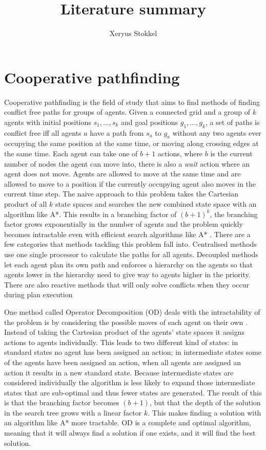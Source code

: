 \documentclass[a4paper]{article}
\title{Literature summary}
\author{Xeryus Stokkel}
\begin{document}
\maketitle

\section{Cooperative pathfinding}
Cooperative pathfinding is the field of study that aims to find methods of
finding conflict free paths for groups of agents. Given a connected grid and a
group of $k$ agents with initial positions $s_1, \ldots, s_k$ and goal
positions $g_1, \ldots, g_k$, a set of paths is conflict free iff all agents
$a$ have a path from $s_a$ to $g_a$ without any two agents ever occupying
the same position at the same time, or moving along crossing edges at the same
time. Each agent can take one of $b+1$ actions, where $b$ is the current number
of nodes the agent can move into, there is also a \textit{wait} action where an
agent does not move. Agents are allowed to move at the same time and are
allowed to move to a position if the currently occupying agent also moves in
the current time step. The naive approach to this problem takes the Cartesian
product of all $k$ state spaces and searches the new combined state space with 
an algorithm like A*.
This results in a branching factor of $(b+1)^k$, the branching factor grows
exponentially in the number of agents and the problem quickly becomes
intractable even with efficient search algorithms like A* \cite{sharon2013}.
There are a few categories that methods tackling this problem fall into.
Centralised methods use one single processor to calculate the paths for all
agents. Decoupled methods let each agent plan its own path and enforces a
hierarchy on the agents so that agents lower in the hierarchy need to give way
to agents higher in the priority. There are also reactive methods that will
only solve conflicts when they occur during plan execution

One method called Operator Decomposition (OD) deals with the intractability of
the problem is by considering the possible moves of each agent on their own
\cite{standley2010,standley2011}. Instead of taking the Cartesian product of
the agents' state spaces it assigns actions to agents individually. This leads
to two different kind of states: in standard states no agent has been assigned
an action; in intermediate states some of the agents have been assigned an
action, when all agents are assigned an action it results in a new standard
state. Because intermediate states are considered individually the algorithm is
less likely to expand those intermediate states that are sub-optimal and thus 
fewer states are generated. The result of this is that the branching factor 
becomes $(b+1)$, but that the depth of the solution in the search tree grows 
with a linear factor $k$. This makes finding a solution with an algorithm like 
A* more tractable. OD is a complete and optimal algorithm, meaning that it will
always find a solution if one exists, and it will find the best solution.
\end{document}
